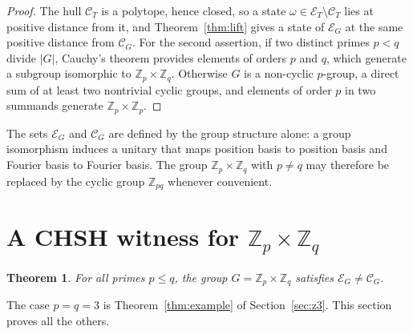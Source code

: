 \documentclass[11pt,a4paper]{article}
\newtheorem{theorem}{Theorem}
\theoremstyle{definition}
\theoremstyle{plain}
\newenvironment{statementframe}{%
  \par\addvspace{0.55\baselineskip}\noindent
  \begingroup\setlength{\fboxrule}{0.3pt}\setlength{\fboxsep}{7pt}%
  \begin{lrbox}{\statementbox}%
  \begin{minipage}{\dimexpr\linewidth-2\fboxsep-2\fboxrule\relax}%
}{%
  \end{minipage}\end{lrbox}%
  {\color{black!45}\fbox{\color{black}\usebox{\statementbox}}}%
  \endgroup\par\addvspace{0.45\baselineskip}%
}
\newcommand{\Z}{\mathbb Z}
\newcommand{\E}{\mathcal E}
\newcommand{\hull}{\mathcal C}
\begin{document}
\begin{proof}
The hull $\hull_T$ is a polytope, hence closed, so a state
$\omega\in\E_T\setminus\hull_T$ lies at positive distance from it, and
Theorem~\ref{thm:lift} gives a state of $\E_G$ at the same positive distance
from $\hull_G$. For the second assertion, if two distinct primes $p<q$ divide
$|G|$, Cauchy's theorem provides elements of orders $p$ and $q$, which
generate a subgroup isomorphic to $\Z_p\times\Z_q$. Otherwise $G$ is a
non-cyclic $p$-group, a direct sum of at least two nontrivial cyclic groups,
and elements of order $p$ in two summands generate $\Z_p\times\Z_p$.
\end{proof}

The sets $\E_G$ and $\hull_G$ are defined by the group structure alone: a
group isomorphism induces a unitary that maps position basis to position
basis and Fourier basis to Fourier basis. The group $\Z_p\times\Z_q$ with
$p\neq q$ may therefore be replaced by the cyclic group $\Z_{pq}$ whenever
convenient.

\section{A CHSH witness for $\Z_p\times\Z_q$}\label{sec:chsh}

\begin{statementframe}
\begin{theorem}\label{thm:pq}
For all primes $p\leq q$, the group $G=\Z_p\times\Z_q$ satisfies
$\E_G\neq\hull_G$.
\end{theorem}
\end{statementframe}

The case $p=q=3$ is Theorem~\ref{thm:example} of Section~\ref{sec:z3}. This
section proves all the others.
\end{document}
